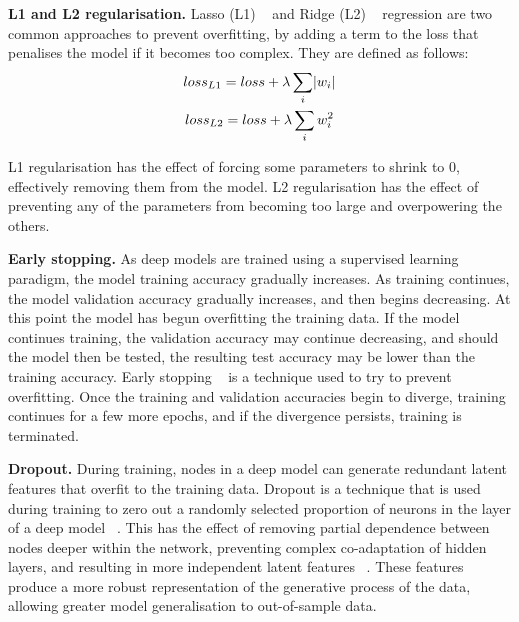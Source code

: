 \noindent \textbf{L1 and L2 regularisation.} Lasso (L1) \unskip ~\citep{tibshirani1996regression} and Ridge (L2) \unskip ~\citep{hoerl1970ridge} regression are two common approaches to prevent overfitting, by adding a term to the loss that penalises the model if it becomes too complex. They are defined as follows:
\begin{subequations}
	\begin{gather}
		loss_{L1} = loss + \lambda\sum_i\abs{w_i}  \\
		loss_{L2} = loss + \lambda\sum_iw_i^2
	\end{gather}
\end{subequations}

\noindent L1 regularisation has the effect of forcing some parameters to shrink to 0, effectively removing them from the model. L2 regularisation has the effect of preventing any of the parameters from becoming too large and overpowering the others. \par

\noindent \textbf{Early stopping.} As deep models are trained using a supervised learning paradigm, the model training accuracy gradually increases. As training continues, the model validation accuracy gradually increases, and then begins decreasing. At this point the model has begun overfitting the training data. If the model continues training, the validation accuracy may continue decreasing, and should the model then be tested, the resulting test accuracy may be lower than the training accuracy. Early stopping \unskip ~\citep{prechelt1998early} is a technique used to try to prevent overfitting. Once the training and validation accuracies begin to diverge, training continues for a few more epochs, and if the divergence persists, training is terminated. \par

\noindent \textbf{Dropout.} During training, nodes in a deep model can generate redundant latent features that overfit to the training data. Dropout is a technique that is used during training to zero out a randomly selected proportion of neurons in the layer of a deep model \unskip ~\citep{srivastava2014dropout}. This has the effect of removing partial dependence between nodes deeper within the network, preventing complex co-adaptation of hidden layers, and resulting in more independent latent features \unskip ~\citep{hinton2012improving}. These features produce a more robust representation of the generative process of the data, allowing greater model generalisation to out-of-sample data. \par

